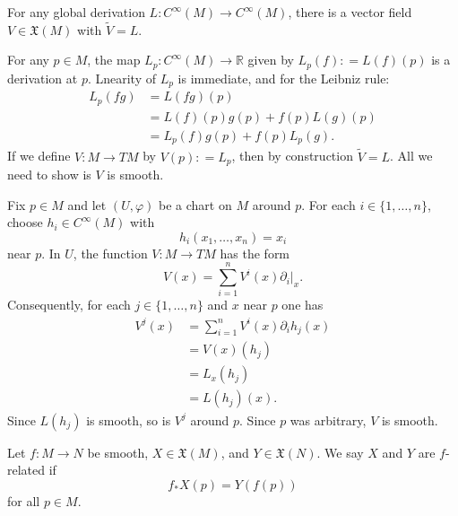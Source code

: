 \documentclass{ximera}
\begin{document}
    
    \begin{proposition}\label{pro:derivations-vector-fields}
        For any global derivation $L : C^{\infty}(M) \to C^{\infty}(M)$, there is a vector field $V  \in \mathfrak{X}(M)$ with $\tilde{V} = L$. 

        
    \begin{solution} 
    For any $p \in M$, the map $L_p: C^{\infty}(M) \to \mathbb{R}$ given by $L_p (f) : = L(f)(p)$ is a derivation at $p$. Lnearity of $L_p$ is immediate, and for the Leibniz rule:
    \begin{align*}
        L_p(fg) & = L(fg)(p) \\
        & = L(f) (p) g (p) + f(p) L(g)(p) \\
        & = L_p (f) g(p) + f(p) L_p (g) .
    \end{align*}    
    If we define $V : M \to TM$ by $V(p) : = L_p$, then by construction $\tilde{V} = L$. All we need to show is $V$ is smooth. 

    Fix $p \in M$ and let $(U, \varphi )$ be a chart on $M$ around $p$. For each $i \in \{ 1 , \ldots , n \} $, choose $h_i \in C^{\infty} (M)$ with  
    \[ h_i (x_1, \ldots, x_n ) = x_i\] 
    near $p$.  In $U$, the function $V : M \to TM$ has the form
    \[     V ( x ) =  \sum_{ i = 1 }^n V^i (x) \partial_i \vert _x  .   \]
    Consequently, for  each $j \in \{ 1 , \ldots , n \} $ and $x$ near $p$ one has 
    \begin{align*}
      V^j (x) & =  \sum _{ i = 1 }^n V^i (x) \partial_i h_j (x)    \\
      & = V (x) (h_j ) \\
      & = L_ x (h_j) \\
      & = L (h_j) (x).
    \end{align*}
    Since $L(h_j)$ is smooth, so is $V^j$ around $p$. Since $p$ was arbitrary, $V$ is smooth. 
    \end{solution}

    \end{proposition}



    \begin{definition}
        Let $f : M \to N$ be smooth, $X \in \mathfrak{X}(M)$, and $Y \in \mathfrak{X}(N)$. We say $X$ and $Y$ are $f$-related if
        \[    f_{\ast} X(p) = Y(f(p))     \]
        for all $p \in M$. 
        \end{definition}
\end{document}
